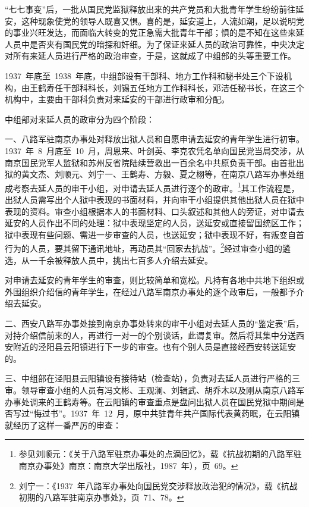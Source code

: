 “七七事变”后，一批从国民党监狱释放出来的共产党员和大批青年学生纷纷前往延安，这种现象使党的领导人既喜又惧。喜的是，延安道上，人流如潮，足以说明党的事业兴旺发达，而面临大转变的党正急需大批青年干部；惧的是不知在这些来延人员中是否夹有国民党的暗探和奸细。为了保证来延人员的政治可靠性，中央决定对所有来延人员进行严格的政治审查，于是，这就成了中组部的头等重要工作。

1937~年底至~1938~年底，中组部设有干部科、地方工作科和秘书处三个下设机构，由王鹤寿任干部科科长，刘锡五任地方工作科科长，邓洁任秘书长，在这三个机构中，主要由干部科负责对来延安的干部进行政审和分配。

中组部对来延人员的政审分为四个阶段：

一、八路军驻南京办事处对释放出狱人员和自愿申请去延安的青年学生进行初审。1937~年~8~月底至~10~月，周恩来、叶剑英、李克农凭名单向国民党当局交涉，从南京国民党军人监狱和苏州反省院陆续营救出一百余名中共原负责干部。由首批出狱的黄文杰、刘顺元、刘宁一、王鹤寿、方毅、夏之栩等，在南京八路军办事处组成考察去延人员的审干小组，对申请去延人员进行逐个的政审。\footnote{参见刘顺元：《关于八路军驻京办事处的点滴回忆》，载《抗战初期的八路军驻南京办事处》南京：南京大学出版社，1987~年），页~69。}其工作流程是，出狱人员需写出个人狱中表现的书面材料，并向审干小组提供其他出狱人员在狱中表现的资料。审查小组根据本人的书面材料、口头叙述和其他人的旁证，对申请去延安的人员作出不同的处理：狱中表现坚定的人员，送延安或直接留国统区工作；狱中表现有些问题、需进一步审查的人员，也送延安；狱中表现不好，有叛变自首行为的人员，要其留下通讯地址，再动员其“回家去抗战”。\footnote{刘宁一：《1937~年八路军办事处向国民党交涉释放政治犯的情况》，载《抗战初期的八路军驻南京办事处》，页~71、78。}经过审查小组的遴选，从一千余被释放人员中，挑出七百多人介绍去延安。

对申请去延安的青年学生的审查，则比较简单和宽松。凡持有各地中共地下组织或外围组织介绍信的青年学生，在经过八路军南京办事处的逐个政审后，一般都予介绍去延安。

二、西安八路军办事处接到南京办事处转来的审干小组对去延人员的“鉴定表”后，对持介绍信前来的人，再进行一对一的个别谈话，此谓复审。然后将其集中分送西安附近的泾阳县云阳镇进行下一步的审查。也有个别人员是直接经西安转送延安的。

三、中组部在泾阳县云阳镇设有接待站（检查站），负责对去延人员进行严格的三审。领导审查小组的人员有冯文彬、王观澜、刘辑武、胡乔木以及刚从南京八路军办事处调来的王鹤寿等。在云阳镇的审查重点是盘问出狱人员在国民党狱中期间是否写过“悔过书”。1937~年~12~月，原中共驻青年共产国际代表黄药眠，在云阳镇就经历了这样一番严厉的审查：

